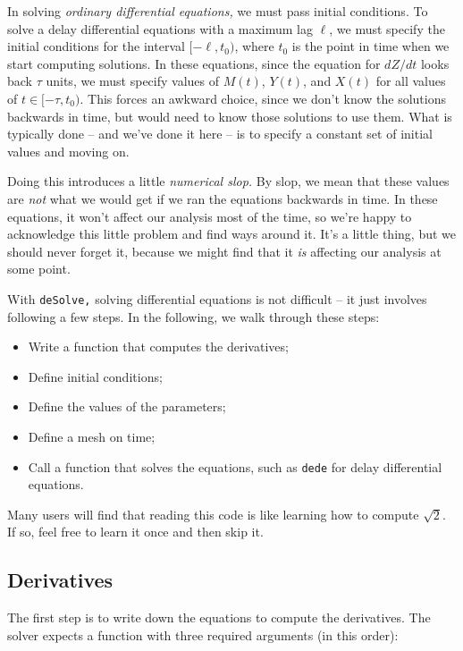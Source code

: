 \documentclass[
]{book}
\begin{document}
In solving \emph{ordinary differential equations,} we must pass initial conditions. To solve a delay differential equations with a maximum lag \(\ell\), we must specify the initial conditions for the interval \([-\ell, t_0)\), where \(t_0\) is the point in time when we start computing solutions.
In these equations, since the equation for \(dZ/dt\) looks back \(\tau\) units, we must specify values of \(M(t)\), \(Y(t)\), and \(X(t)\) for all values of \(t \in [-\tau, t_0)\). This forces an awkward choice, since we don't know the solutions backwards in time, but would need to know those solutions to use them. What is typically done -- and we've done it here -- is to specify a constant set of initial values and moving on.

Doing this introduces a little \emph{numerical slop.} By slop, we mean that these values are \emph{not} what we would get if we ran the equations backwards in time. In these equations, it won't affect our analysis most of the time, so we're happy to acknowledge this little problem and find ways around it. It's a little thing, but we should never forget it, because we might find that it \emph{is} affecting our analysis at some point.

With \texttt{deSolve,} solving differential equations is not difficult -- it just involves following a few steps. In the following, we walk through these steps:

\begin{itemize}
\item
  Write a function that computes the derivatives;
\item
  Define initial conditions;
\item
  Define the values of the parameters;
\item
  Define a mesh on time;
\item
  Call a function that solves the equations, such as \texttt{dede} for delay differential equations.
\end{itemize}

Many users will find that reading this code is like learning how to compute \(\sqrt{2}\). If so, feel free to learn it once and then skip it.

\hypertarget{derivatives}{%
\subsection{Derivatives}\label{derivatives}}

The first step is to write down the equations to compute the derivatives. The solver expects a function with three required arguments (in this order):
\end{document}
